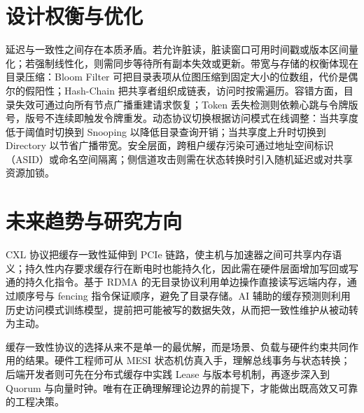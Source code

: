 \chapter{设计权衡与优化}
延迟与一致性之间存在本质矛盾。若允许脏读，脏读窗口可用时间戳或版本区间量化；若强制线性化，则需同步等待所有副本失效或更新。带宽与存储的权衡体现在目录压缩：Bloom Filter 可把目录表项从位图压缩到固定大小的位数组，代价是偶尔的假阳性；Hash-Chain 把共享者组织成链表，访问时按需遍历。容错方面，目录失效可通过向所有节点广播重建请求恢复；Token 丢失检测则依赖心跳与令牌版号，版号不连续即触发令牌重发。动态协议切换根据访问模式在线调整：当共享度低于阈值时切换到 Snooping 以降低目录查询开销；当共享度上升时切换到 Directory 以节省广播带宽。安全层面，跨租户缓存污染可通过地址空间标识（ASID）或命名空间隔离；侧信道攻击则需在状态转换时引入随机延迟或对共享资源加锁。\par
\chapter{未来趋势与研究方向}
CXL 协议把缓存一致性延伸到 PCIe 链路，使主机与加速器之间可共享内存语义；持久性内存要求缓存行在断电时也能持久化，因此需在硬件层面增加写回或写通的持久化指令。基于 RDMA 的无目录协议利用单边操作直接读写远端内存，通过顺序号与 fencing 指令保证顺序，避免了目录存储。AI 辅助的缓存预测则利用历史访问模式训练模型，提前把可能被写的数据失效，从而把一致性维护从被动转为主动。\par
缓存一致性协议的选择从来不是单一的最优解，而是场景、负载与硬件约束共同作用的结果。硬件工程师可从 MESI 状态机仿真入手，理解总线事务与状态转换；后端开发者则可先在分布式缓存中实践 Lease 与版本号机制，再逐步深入到 Quorum 与向量时钟。唯有在正确理解理论边界的前提下，才能做出既高效又可靠的工程决策。\par
